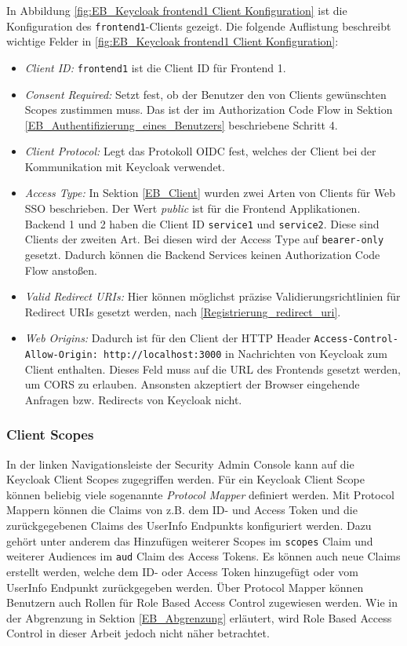 In Abbildung \ref{fig:EB_Keycloak frontend1 Client Konfiguration} ist die Konfiguration des \texttt{frontend1}-Clients gezeigt. Die folgende Auflistung beschreibt wichtige Felder in \ref{fig:EB_Keycloak frontend1 Client Konfiguration}:
\begin{itemize}
	\item \emph{Client ID:} \texttt{frontend1} ist die Client ID für Frontend 1.
	
	\item \emph{Consent Required:} Setzt fest, ob der Benutzer den von Clients gewünschten Scopes zustimmen muss. Das ist der im Authorization Code Flow in Sektion \ref{EB_Authentifizierung_eines_Benutzers} beschriebene Schritt 4.
	
	\item \emph{Client Protocol:} Legt das Protokoll OIDC fest, welches der Client bei der Kommunikation mit Keycloak verwendet.
	
	\item \emph{Access Type:} In Sektion \ref{EB_Client} wurden zwei Arten von Clients für Web SSO beschrieben. Der Wert \textit{public} ist für die Frontend Applikationen. Backend 1 und 2 haben die Client ID \texttt{service1} und \texttt{service2}. Diese sind Clients der zweiten Art. Bei diesen wird der Access Type auf \texttt{bearer-only} gesetzt. Dadurch können die Backend Services keinen Authorization Code Flow anstoßen.
	
	\item \emph{Valid Redirect URIs:} Hier können möglichst präzise Validierungsrichtlinien für Redirect URIs gesetzt werden, nach \ref{Registrierung_redirect_uri}.
	
	\item \emph{Web Origins:} Dadurch ist für den Client der HTTP Header \texttt{Access-Control-Allow-Origin: http://localhost:3000} in Nachrichten von Keycloak zum Client enthalten. Dieses Feld muss auf die URL des Frontends gesetzt werden, um CORS zu erlauben. Ansonsten akzeptiert der Browser eingehende Anfragen bzw. Redirects von Keycloak nicht.
\end{itemize}

\subsubsection{Client Scopes}

In der linken Navigationsleiste der Security Admin Console kann auf die Keycloak Client Scopes zugegriffen werden. Für ein Keycloak Client Scope können beliebig viele sogenannte \textit{Protocol Mapper} definiert werden. Mit Protocol Mappern können die Claims von z.B. dem ID- und Access Token und die zurückgegebenen Claims des UserInfo Endpunkts konfiguriert werden. Dazu gehört unter anderem das Hinzufügen weiterer Scopes im \texttt{scopes} Claim und weiterer Audiences im \texttt{aud} Claim des Access Tokens. Es können auch neue Claims erstellt werden, welche dem ID- oder Access Token hinzugefügt oder vom UserInfo Endpunkt zurückgegeben werden. Über Protocol Mapper können Benutzern auch Rollen für Role Based Access Control zugewiesen werden. Wie in der Abgrenzung in Sektion \ref{EB_Abgrenzung} erläutert, wird Role Based Access Control in dieser Arbeit jedoch nicht näher betrachtet. 

